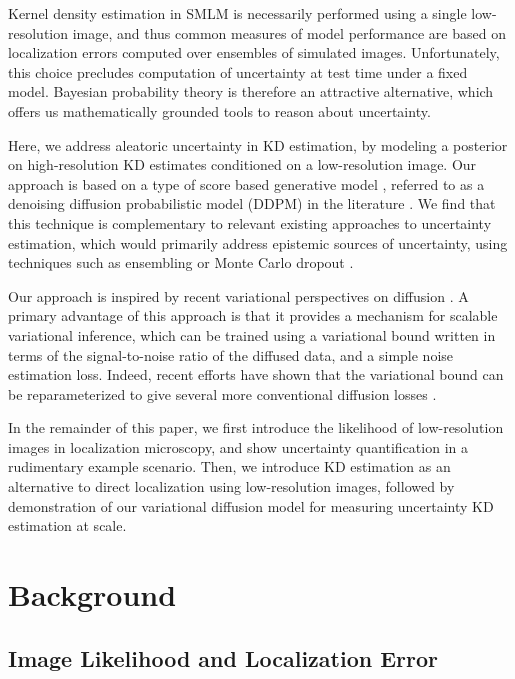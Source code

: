 \documentclass{article}
\begin{document}
Kernel density estimation in SMLM is necessarily performed using a single low-resolution image, and thus common measures of model performance are based on localization errors computed over ensembles of simulated images. Unfortunately, this choice precludes computation of uncertainty at test time under a fixed model. Bayesian probability theory is therefore an attractive alternative, which offers us mathematically grounded tools to reason about uncertainty. 

Here, we address aleatoric uncertainty in KD estimation, by modeling a posterior on high-resolution KD estimates conditioned on a low-resolution image. Our approach is based on a type of score based generative model \citep{Song2021}, referred to as a denoising diffusion probabilistic model (DDPM) in the literature \citep{Ho2020,Song2021}. We find that this technique is complementary to relevant existing approaches to uncertainty estimation, which would primarily address epistemic sources of uncertainty, using techniques such as ensembling \citep{Lakshminarayanan2017} or Monte Carlo dropout \citep{Gal2022}. 

Our approach is inspired by recent variational perspectives on diffusion \citep{Dirmeier2023,Ribeiro2024,Kingma2021,Kingma2023}.  A primary advantage of this approach is that it provides a mechanism for scalable variational inference, which can be trained using a variational bound written in terms of the signal-to-noise ratio of the diffused data, and a simple noise estimation loss. Indeed, recent efforts have shown that the variational bound can be reparameterized to give several more conventional diffusion losses \citep{Kingma2021,Kingma2023,Ribeiro2024}. 

In the remainder of this paper, we first introduce the likelihood of low-resolution images in localization microscopy, and show uncertainty quantification in a rudimentary example scenario. Then, we introduce KD estimation as an alternative to direct localization using low-resolution images, followed by demonstration of our variational diffusion model for measuring uncertainty KD estimation at scale. 

\section{Background}

\subsection{Image Likelihood and Localization Error}
\end{document}
